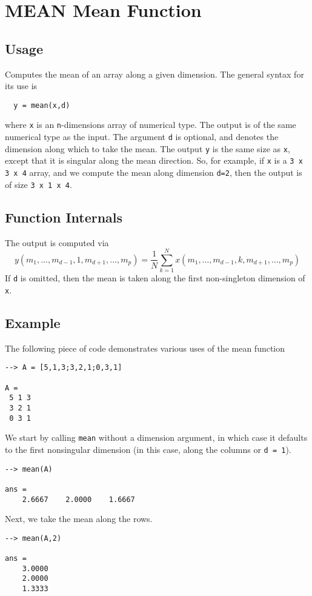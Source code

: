 \section{MEAN Mean Function}

\subsection{Usage}

Computes the mean of an array along a given dimension.  The general
syntax for its use is
\begin{verbatim}
  y = mean(x,d)
\end{verbatim}
where \verb|x| is an \verb|n|-dimensions array of numerical type.
The output is of the same numerical type as the input.  The argument
\verb|d| is optional, and denotes the dimension along which to take
the mean.  The output \verb|y| is the same size as \verb|x|, except
that it is singular along the mean direction.  So, for example,
if \verb|x| is a \verb|3 x 3 x 4| array, and we compute the mean along
dimension \verb|d=2|, then the output is of size \verb|3 x 1 x 4|.
\subsection{Function Internals}

The output is computed via
\[
y(m_1,\ldots,m_{d-1},1,m_{d+1},\ldots,m_{p}) = \frac{1}{N}
\sum_{k=1}^{N} x(m_1,\ldots,m_{d-1},k,m_{d+1},\ldots,m_{p})
\]
If \verb|d| is omitted, then the mean is taken along the 
first non-singleton dimension of \verb|x|. 
\subsection{Example}

The following piece of code demonstrates various uses of the mean
function
\begin{verbatim}
--> A = [5,1,3;3,2,1;0,3,1]

A = 
 5 1 3 
 3 2 1 
 0 3 1 
\end{verbatim}
We start by calling \verb|mean| without a dimension argument, in which 
case it defaults to the first nonsingular dimension (in this case, 
along the columns or \verb|d = 1|).
\begin{verbatim}
--> mean(A)

ans = 
    2.6667    2.0000    1.6667 
\end{verbatim}
Next, we take the mean along the rows.
\begin{verbatim}
--> mean(A,2)

ans = 
    3.0000 
    2.0000 
    1.3333 
\end{verbatim}
